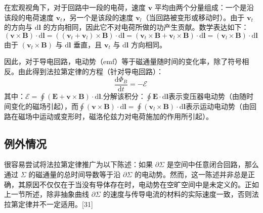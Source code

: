 在宏观视角下，对于回路中一段的电荷，速度 \( \mathbf{v} \) 平均由两个分量组成：一个是沿该段的电荷速度 \( \mathbf{v}_t \)，另一个是该段的速度 \( \mathbf{v}_l \)（当回路被变形或移动时）。由于 \( \mathbf{v}_t \) 的方向与 \( \mathrm{d}\mathbf{l} \) 的方向相同，因此它不对电荷所做的功产生贡献。数学表达如下：
\[
(\mathbf{v} \times \mathbf{B}) \cdot \mathrm{d}\mathbf{l} = ((\mathbf{v}_t + \mathbf{v}_l) \times \mathbf{B}) \cdot \mathrm{d}\mathbf{l} = (\mathbf{v}_t \times \mathbf{B} + \mathbf{v}_l \times \mathbf{B}) \cdot \mathrm{d}\mathbf{l} = (\mathbf{v}_l \times \mathbf{B}) \cdot \mathrm{d}\mathbf{l}~
\]
由于 \( (\mathbf{v}_t \times \mathbf{B}) \) 与 \( \mathrm{d}\mathbf{l} \) 垂直，且 \( \mathbf{v}_t \) 与 \( \mathrm{d}\mathbf{l} \) 方向相同。

因此，对于导电回路，电动势（emf）等于磁通量随时间的变化率，除了符号相反。由此得到法拉第定律的方程（针对导电回路）：
\[
\frac{\mathrm{d} \Phi_B}{\mathrm{d} t} = -\mathcal{E}~
\]
其中：\(\mathcal{E} = \oint \left( \mathbf{E} + \mathbf{v} \times \mathbf{B} \right) \cdot \mathrm{d}\mathbf{l}.\)分解该积分：\(\oint \mathbf{E} \cdot \mathrm{d}\mathbf{l}\)表示变压器电动势（由随时间变化的磁场引起），而\(\oint (\mathbf{v} \times \mathbf{B}) \cdot \mathrm{d}\mathbf{l} = \oint (\mathbf{v}_l \times \mathbf{B}) \cdot \mathrm{d}\mathbf{l}\)表示运动电动势（由回路在磁场中运动或变形时，磁洛伦兹力对电荷施加的作用所引起）。
\subsection{例外情况}
很容易尝试将法拉第定律推广为以下陈述：如果 \(\partial\Sigma\) 是空间中任意闭合回路，那么通过 \(\Sigma\) 的磁通量的总时间导数等于沿 \(\partial\Sigma\) 的电动势。然而，这一陈述并非总是正确，其原因不仅仅在于当没有导体存在时，电动势在空旷空间中是未定义的。正如上一节所述，除非抽象曲线 \(\partial\Sigma\) 的速度与传导电流的材料的实际速度一致，否则法拉第定律并不一定适用。[31]  

